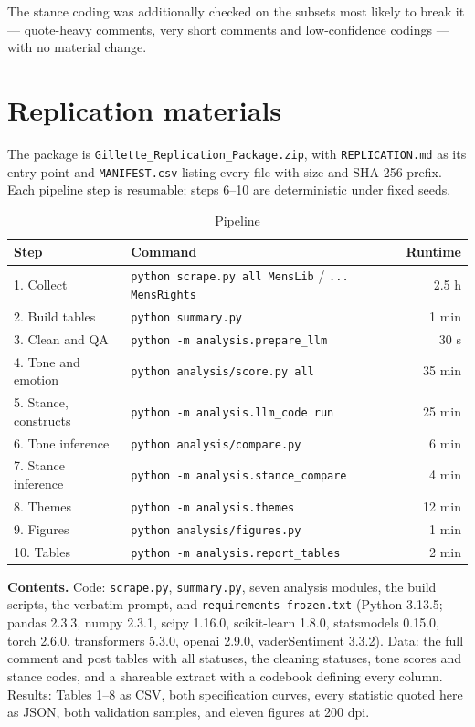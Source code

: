 \documentclass[11pt,a4paper]{article}
\newcommand{\code}[1]{\texttt{\small #1}}
\begin{document}
The stance coding was additionally checked on the subsets most likely to break it --- quote-heavy
comments, very short comments and low-confidence codings --- with no material change.

\section{Replication materials}

The package is \code{Gillette\_Replication\_Package.zip}, with \code{REPLICATION.md} as its entry
point and \code{MANIFEST.csv} listing every file with size and SHA-256 prefix. Each pipeline step is
resumable; steps 6--10 are deterministic under fixed seeds.

\begin{table}[h]
\centering\small
\caption{Pipeline}
\begin{tabular}{llr}
\toprule
Step & Command & Runtime \\
\midrule
1. Collect             & \code{python scrape.py all MensLib} / \code{... MensRights} & 2.5 h \\
2. Build tables        & \code{python summary.py}                   & 1 min \\
3. Clean and QA        & \code{python -m analysis.prepare\_llm}      & 30 s \\
4. Tone and emotion    & \code{python analysis/score.py all}        & 35 min \\
5. Stance, constructs  & \code{python -m analysis.llm\_code run}     & 25 min \\
6. Tone inference      & \code{python analysis/compare.py}          & 6 min \\
7. Stance inference    & \code{python -m analysis.stance\_compare}   & 4 min \\
8. Themes              & \code{python -m analysis.themes}           & 12 min \\
9. Figures             & \code{python analysis/figures.py}          & 1 min \\
10. Tables             & \code{python -m analysis.report\_tables}    & 2 min \\
\bottomrule
\end{tabular}
\end{table}

\textbf{Contents.} Code: \code{scrape.py}, \code{summary.py}, seven analysis modules, the build
scripts, the verbatim prompt, and \code{requirements-frozen.txt} (Python 3.13.5; pandas 2.3.3,
numpy 2.3.1, scipy 1.16.0, scikit-learn 1.8.0, statsmodels 0.15.0, torch 2.6.0, transformers 5.3.0,
openai 2.9.0, vaderSentiment 3.3.2). Data: the full comment and post tables with all statuses, the
cleaning statuses, tone scores and stance codes, and a shareable extract with a codebook defining
every column. Results: Tables 1--8 as CSV, both specification curves, every statistic quoted here as
JSON, both validation samples, and eleven figures at 200 dpi.
\end{document}
